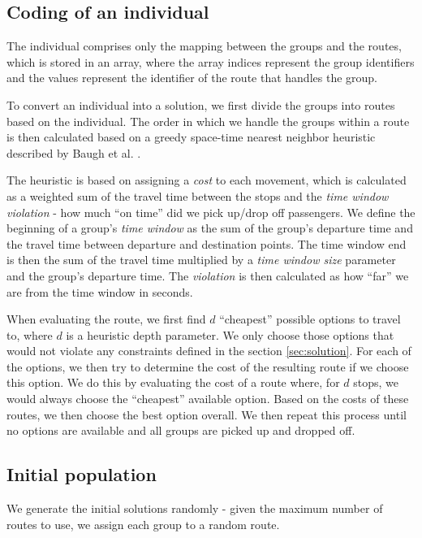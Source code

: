 \subsection{Coding of an individual}

The individual comprises only the mapping between the groups and the routes, which is stored in an array, where the array indices represent the group identifiers and the values represent the identifier of the route that handles the group.

To convert an individual into a solution, we first divide the groups into routes based on the individual. The order in which we handle the groups within a route is then calculated based on a greedy space-time nearest neighbor heuristic described by Baugh et al. \cite{Baugh1998INTRACTABILITYOT}.

The heuristic is based on assigning a \textit{cost} to each movement, which is calculated as a weighted sum of the travel time between the stops and the \textit{time window violation} - how much ``on time'' did we pick up/drop off passengers. We define the beginning of a group's \textit{time window} as the sum of the group's departure time and the travel time between departure and destination points. The time window end is then the sum of the travel time multiplied by a \textit{time window size} parameter and the group's departure time. The \textit{violation} is then calculated as how ``far'' we are from the time window in seconds.

When evaluating the route, we first find $d$ ``cheapest'' possible options to travel to, where $d$ is a heuristic depth parameter. We only choose those options that would not violate any constraints defined in the section \ref{sec:solution}. For each of the options, we then try to determine the cost of the resulting route if we choose this option. We do this by evaluating the cost of a route where, for $d$ stops, we would always choose the ``cheapest'' available option. Based on the costs of these routes, we then choose the best option overall. We then repeat this process until no options are available and all groups are picked up and dropped off.

\subsection{Initial population}

We generate the initial solutions randomly - given the maximum number of routes to use, we assign each group to a random route.

